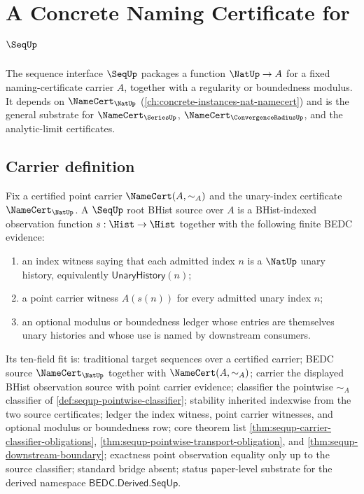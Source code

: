 \chapter{A Concrete Naming Certificate for $\SeqUp$}
\label{ch:concrete-instances-seq-namecert}

The sequence interface $\SeqUp$ packages a function $\NatUp \to A$ for a fixed naming-certificate carrier $A$, together with a regularity or boundedness modulus. It depends on $\NameCert_{\NatUp}$ (\autoref{ch:concrete-instances-nat-namecert}) and is the general substrate for $\NameCert_{\SeriesUp}$, $\NameCert_{\ConvergenceRadiusUp}$, and the analytic-limit certificates.

\section{Carrier definition}
\label{sec:seq-carrier}

\begin{definition}
\label{def:sequp-root-bhist-source}
Fix a certified point carrier $\NameCert(A,\sim_A)$ and the unary-index certificate $\NameCert_{\NatUp}$. A $\SeqUp$ root BHist source over $A$ is a BHist-indexed observation function $s:\Hist\to\Hist$ together with the following finite BEDC evidence:
\begin{enumerate}
  \item an index witness saying that each admitted index $n$ is a $\NatUp$ unary history, equivalently $\mathsf{UnaryHistory}(n)$;
  \item a point carrier witness $A(s(n))$ for every admitted unary index $n$;
  \item an optional modulus or boundedness ledger whose entries are themselves unary histories and whose use is named by downstream consumers.
\end{enumerate}
Its ten-field fit is: traditional target sequences over a certified carrier; BEDC source $\NameCert_{\NatUp}$ together with $\NameCert(A,\sim_A)$; carrier the displayed BHist observation source with point carrier evidence; classifier the pointwise $\sim_A$ classifier of \autoref{def:sequp-pointwise-classifier}; stability inherited indexwise from the two source certificates; ledger the index witness, point carrier witnesses, and optional modulus or boundedness row; core theorem list \autoref{thm:sequp-carrier-classifier-obligations}, \autoref{thm:sequp-pointwise-transport-obligation}, and \autoref{thm:sequp-downstream-boundary}; exactness point observation equality only up to the source classifier; standard bridge absent; status paper-level substrate for the derived namespace $\mathsf{BEDC.Derived.SeqUp}$.
\end{definition}

